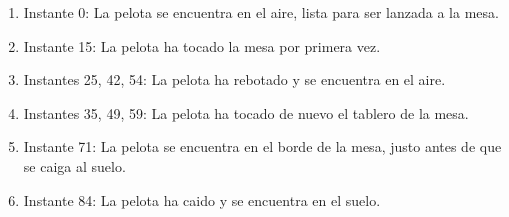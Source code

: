 \documentclass{article}
\begin{document}
\begin{enumerate}
    \item Instante 0: La pelota se encuentra en el aire, lista para ser lanzada a la mesa.
    \item Instante 15: La pelota ha tocado la mesa por primera vez.
    \item Instantes 25, 42, 54: La pelota ha rebotado y se encuentra en el aire.
    \item Instantes 35, 49, 59: La pelota ha tocado de nuevo el tablero de la mesa.
    \item Instante 71: La pelota se encuentra en el borde de la mesa, justo antes de que se caiga al suelo.
    \item Instante 84: La pelota ha caido y se encuentra en el suelo.
\end{enumerate}
\end{document}
